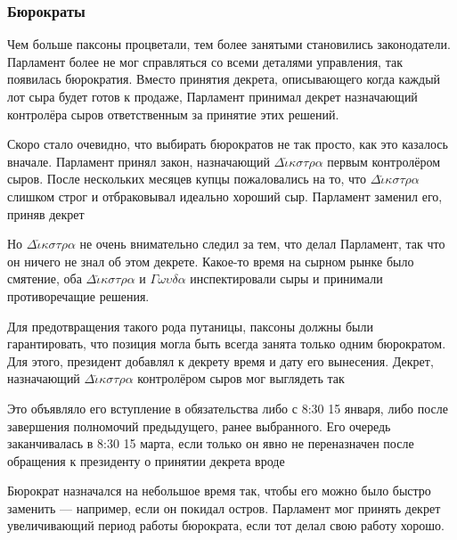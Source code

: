 \documentclass[12pt, a4paper]{article} %
\begin{document}
\subsubsection{Бюрократы}\label{sec:bureaucrats}

Чем больше паксоны процветали, тем более занятыми становились законодатели. Парламент более не мог справляться со всеми деталями управления, так появилась бюрократия. Вместо принятия декрета, описывающего когда каждый лот сыра будет готов к продаже, Парламент принимал декрет назначающий контролёра сыров ответственным за принятие этих решений. 

Скоро стало очевидно, что выбирать бюрократов не так просто, как это казалось вначале. Парламент принял закон, назначающий $\Delta\check{\iota}\kappa\sigma\tau\rho\alpha$ первым контролёром сыров. После нескольких месяцев купцы пожаловались на то, что $\Delta\check{\iota}\kappa\sigma\tau\rho\alpha$ слишком строг и отбраковывал идеально хороший сыр. Парламент заменил его, приняв декрет


Но $\Delta\check{\iota}\kappa\sigma\tau\rho\alpha$ не очень внимательно следил за тем, что делал Парламент, так что он ничего не знал об этом декрете. Какое-то время на сырном рынке было смятение, оба $\Delta\check{\iota}\kappa\sigma\tau\rho\alpha$ и $\Gamma\omega\upsilon\delta\alpha$ инспектировали сыры и принимали противоречащие решения.

Для предотвращения такого рода путаницы, паксоны должны были гарантировать, что позиция могла быть всегда занята только одним бюрократом. Для этого, президент добавлял к декрету время и дату его вынесения. Декрет, назначающий $\Delta\check{\iota}\kappa\sigma\tau\rho\alpha$ контролёром сыров мог выглядеть так


Это объявляло его вступление в обязательства либо с 8:30 15 января, либо после завершения полномочий предыдущего, ранее выбранного. Его очередь заканчивалась в 8:30 15 марта, если только он явно не переназначен после обращения к президенту о принятии декрета вроде


Бюрократ назначался на небольшое время так, чтобы его можно было быстро заменить --- например, если он покидал остров. Парламент мог принять декрет увеличивающий период работы бюрократа, если тот делал свою работу хорошо.
\end{document}
